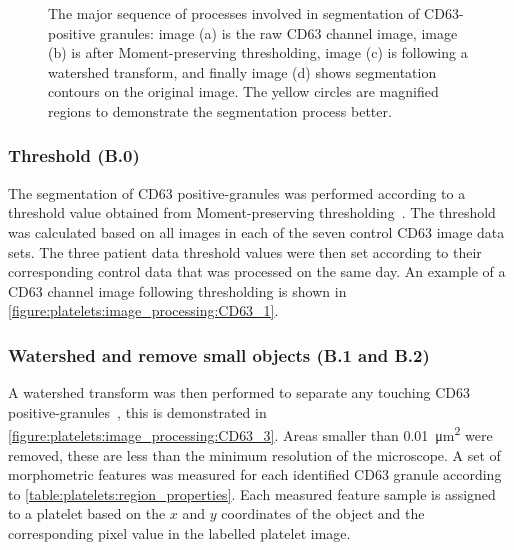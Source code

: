 \begin{figure}[htbp]
\begin{subfigure}[b]{0.45\linewidth}
		\caption{}
		\label{figure:platelets:image_processing:CD63_4}
		\vspace{1ex}
	\end{subfigure}
	\caption[CD63 positive-granule segmentation]{The major sequence of processes involved in segmentation of CD63-positive granules: image (a) is the raw CD63 channel image, image (b) is after Moment-preserving thresholding, image (c) is following a watershed transform, and finally image (d) shows segmentation contours on the original image. The yellow circles are magnified regions to demonstrate the segmentation process better.}
	\label{figure:image_processing:granules}
\end{figure}

\subsubsection{Threshold (B.0)}
The segmentation of CD63 positive-granules was performed according to a threshold value obtained from Moment-preserving thresholding~\cite{Tsai1985}. The threshold was calculated based on all images in each of the seven control CD63 image data sets. The three patient data threshold values were then set according to their corresponding control data that was processed on the same day. An example of a CD63 channel image following thresholding is shown in \autoref{figure:platelets:image_processing:CD63_1}.

\subsubsection{Watershed and remove small objects (B.1 and B.2)}
A watershed transform was then performed to separate any touching CD63 positive-granules~\cite{Vincent1991}, this is demonstrated in \autoref{figure:platelets:image_processing:CD63_3}. Areas smaller than \SI{0.01}{\micro\meter\squared} were removed, these are less than the minimum resolution of the microscope. A set of morphometric features was measured for each identified CD63 granule according to \autoref{table:platelets:region_properties}. Each measured feature sample is assigned to a platelet based on the $x$ and $y$ coordinates of the object and the corresponding pixel value in the labelled platelet image.

